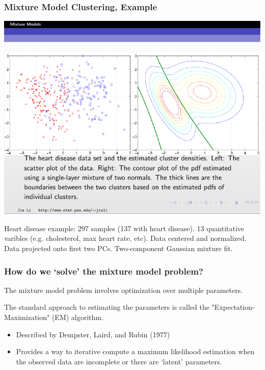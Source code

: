 \documentclass{beamer}
\begin{document}
\begin{frame}
\frametitle{Mixture Model Clustering, Example}
\begin{center}
\includegraphics[width=\textwidth]{heart-disease.pdf}    
\end{center}

Heart disease example: 297 samples (137 with heart disease). 13 quantitative varibles (e.g. cholesterol, max heart rate, etc). Data centered and normalized. Data projected onto first two PCs. Two-component Gaussian mixture fit.

\end{frame}


\begin{frame}
  \frametitle{How do we `solve' the mixture model problem?}

The mixture model problem involves optimization over multiple parameters.

The standard approach to estimating the parameters is called the "Expectation-Maximization" (EM) algorithm.

\begin{itemize}
    \item Described by Dempster, Laird, and Rubin (1977)
    \item Provides a way to iterative compute a maximum likelihood estimation when the observed data are incomplete or there are `latent' parameters.
\end{itemize}


\end{frame}
\end{document}
